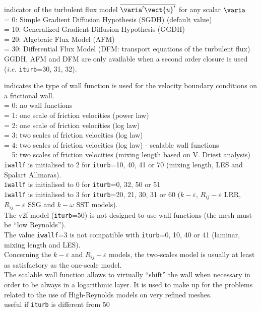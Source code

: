 {indicator of the turbulent flux model $ \overline{\varia^\prime \vect{u}^\prime}$
for any scalar $\varia$\\
\hspace*{1.3cm}= 0: Simple Gradient Diffusion Hypothesis (SGDH) (default value)\\
\hspace*{1.3cm}= 10: Generalized Gradient Diffusion Hypothesis (GGDH)\\
\hspace*{1.3cm}= 20: Algebraic Flux Model (AFM)\\
\hspace*{1.3cm}= 30: Differential Flux Model (DFM: transport equations of the turbulent flux)\\
GGDH, AFM and DFM are only available when a second order closure is used ({\em i.e.} {\tt iturb}=30, 31, 32).
}

{indicates the type of wall function is used for
 the velocity boundary conditions on a frictional wall.\\
\hspace*{1.3cm}= 0: no wall functions\\
\hspace*{1.3cm}= 1: one scale of friction velocities (power law)\\
\hspace*{1.3cm}= 2: one scale of friction velocities (log law)\\
\hspace*{1.3cm}= 3: two scales of friction velocities (log law)\\
\hspace*{1.3cm}= 4: two scales of friction velocities (log law) - scalable wall functions\\
\hspace*{1.3cm}= 5: two scales of friction velocities (mixing length based on V. Driest analysis)\\
{\tt iwallf} is initialised to 2 for {\tt iturb}=10, 40, 41 or 70
(mixing length, LES and Spalart Allmaras).\\
{\tt iwallf} is initialised to 0 for {\tt iturb}=0, 32, 50 or 51\\
{\tt iwallf} is initialised to 3 for {\tt iturb}=20, 21, 30, 31 or 60
($k-\varepsilon$, $R_{ij}-\varepsilon$ LRR, $R_{ij}-\varepsilon$ SSG and
$k-\omega$ SST models).\\
The v2f model ({\tt iturb}=50) is not designed to use wall functions
(the mesh must be ``low Reynolds'').\\
The value {\tt iwallf}=3 is not compatible with {\tt iturb}=0, 10, 40
or 41 (laminar, mixing length and LES).\\
Concerning the $k-\varepsilon$ and $R_{ij}-\varepsilon$ models, the
two-scales model is usually at least as satisfactory as the one-scale
model.\\
The scalable wall function allows to virtually ``shift'' the wall when
necessary in order to be always in a logarithmic layer.
It is used to make up for
the problems related to the use of High-Reynolds models on very refined
meshes.\\
useful if {\tt iturb} is different from 50}

